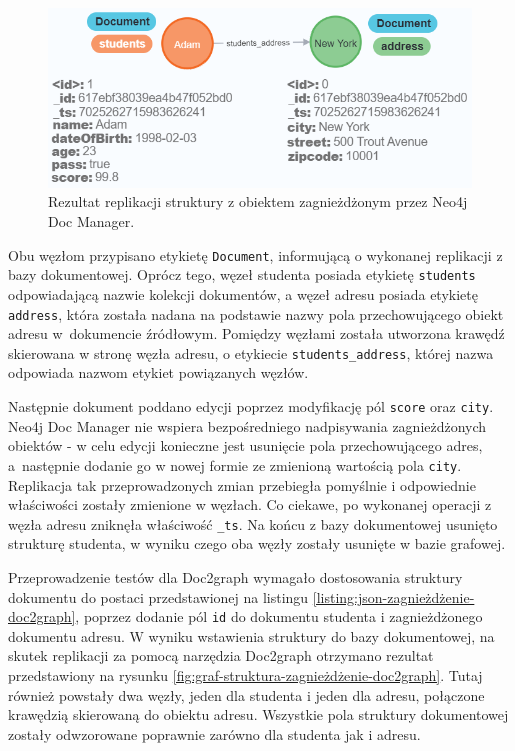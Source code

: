 \documentclass[a4paper,twoside,12pt]{book}
\begin{document}
\begin{figure}[!h]
\centering
\captionsetup{justification=centering}
\includegraphics[width=12cm]{images/zagnieżdżenie_neo4jdocmanager.png}
\caption{Rezultat replikacji struktury z obiektem zagnieżdżonym przez Neo4j Doc Manager.}
\label{fig:graf-struktura-zagnieżdżenie-neo4jdocmanager}
\end{figure}

Obu węzłom przypisano etykietę \texttt{Document}, informującą o wykonanej replikacji z bazy dokumentowej. Oprócz tego, węzeł studenta posiada etykietę \texttt{students} odpowiadającą nazwie kolekcji dokumentów, a węzeł adresu posiada etykietę \texttt{address}, która została nadana na podstawie nazwy pola przechowującego obiekt adresu w~dokumencie źródłowym. Pomiędzy węzłami została utworzona krawędź skierowana w stronę węzła adresu, o etykiecie \texttt{students\_address}, której nazwa odpowiada nazwom etykiet powiązanych węzłów.

Następnie dokument poddano edycji poprzez modyfikację pól \texttt{score} oraz \texttt{city}. Neo4j Doc Manager nie wspiera bezpośredniego nadpisywania zagnieżdżonych obiektów - w celu edycji konieczne jest usunięcie pola przechowującego adres, a~następnie dodanie go w nowej formie ze zmienioną wartością pola \texttt{city}. Replikacja tak przeprowadzonych zmian przebiegła pomyślnie i odpowiednie właściwości zostały zmienione w węzłach. Co ciekawe, po wykonanej operacji z węzła adresu zniknęła właściwość \texttt{\_ts}. Na końcu z bazy dokumentowej usunięto strukturę studenta, w wyniku czego oba węzły zostały usunięte w bazie grafowej.

Przeprowadzenie testów dla Doc2graph wymagało dostosowania struktury dokumentu do postaci przedstawionej na listingu \ref{listing:json-zagnieżdżenie-doc2graph}, poprzez dodanie pól \texttt{id} do dokumentu studenta i zagnieżdżonego dokumentu adresu. W wyniku wstawienia struktury do bazy dokumentowej, na skutek replikacji za pomocą narzędzia Doc2graph otrzymano rezultat przedstawiony na rysunku \ref{fig:graf-struktura-zagnieżdżenie-doc2graph}. Tutaj również powstały dwa węzły, jeden dla studenta i jeden dla adresu, połączone krawędzią skierowaną do obiektu adresu. Wszystkie pola struktury dokumentowej zostały odwzorowane poprawnie zarówno dla studenta jak i adresu. 
\end{document}
